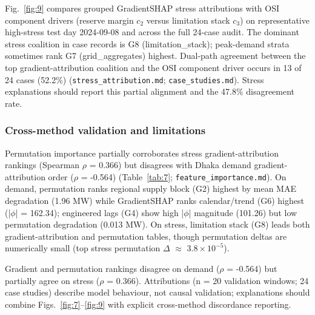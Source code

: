 Fig.~\ref{fig:9} compares grouped GradientSHAP stress attributions with OSI component drivers (reserve margin \(c_2\) versus limitation stack \(c_3\)) on representative high-stress test day 2024-09-08 and across the full 24-case audit. The dominant stress coalition in case records is G8 (limitation\_stack); peak-demand strata sometimes rank G7 (grid\_aggregates) highest. Dual-path agreement between the top gradient-attribution coalition and the OSI component driver occurs in 13 of 24 cases (52.2\%) (\texttt{stress\_attribution.md}; \texttt{case\_studies.md}). Stress explanations should report this partial alignment and the 47.8\% disagreement rate.

\subsubsection{Cross-method validation and limitations}\label{subsubsection:cross_method_validation_and_limitations}

Permutation importance partially corroborates stress gradient-attribution rankings (Spearman $\rho$ = 0.366) but disagrees with Dhaka demand gradient-attribution order ($\rho$ = -0.564) (Table~\ref{tab:7}; \texttt{feature\_importance.md}). On demand, permutation ranks regional supply block (G2) highest by mean MAE degradation (1.96 MW) while GradientSHAP ranks calendar/trend (G6) highest (|$\phi$| = 162.34); engineered lags (G4) show high |$\phi$| magnitude (101.26) but low permutation degradation (0.013 MW). On stress, limitation stack (G8) leads both gradient-attribution and permutation tables, though permutation deltas are numerically small (top stress permutation $\Delta$ $\approx$ $3.8 \times 10^{-5}$).

Gradient and permutation rankings disagree on demand ($\rho$ = -0.564) but partially agree on stress ($\rho$ = 0.366). Attributions (n = 20 validation windows; 24 case studies) describe model behaviour, not causal validation; explanations should combine Figs.~\ref{fig:7}--\ref{fig:9} with explicit cross-method discordance reporting.













